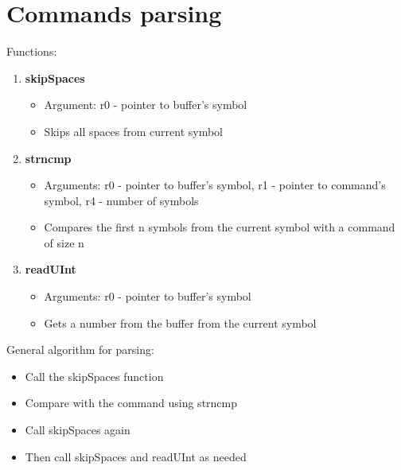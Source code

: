\section*{Commands parsing}

Functions:

\begin{enumerate}
	\item \textbf{skipSpaces}
		\begin{itemize}
			\item Argument: r0 - pointer to buffer's symbol
			\item Skips all spaces from current symbol
		\end{itemize}
\item \textbf{strncmp}
	\begin{itemize}
		\item Arguments: r0 - pointer to buffer's symbol, r1 - pointer to command's symbol, r4 - number of symbols
		\item Compares the first n symbols from the current symbol with a command of size n
	\end{itemize}
\item \textbf{readUInt}
	\begin{itemize}
		\item Arguments: r0 - pointer to buffer's symbol
		\item Gets a number from the buffer from the current symbol
	\end{itemize}
\end{enumerate}

General algorithm for parsing:

\begin{itemize}
	\item Call the skipSpaces function
	\item Compare with the command using strncmp
	\item Call skipSpaces again
	\item Then call skipSpaces and readUInt as needed
\end{itemize}
